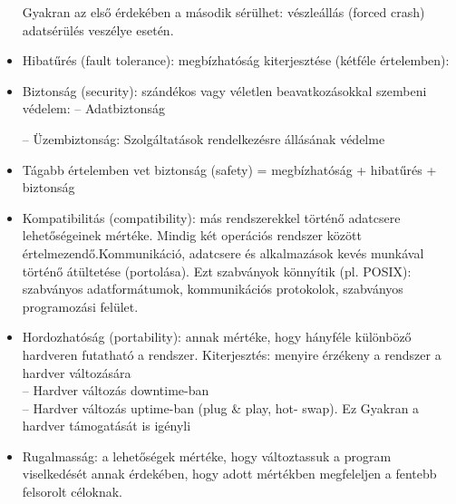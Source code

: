 \documentclass[fleqn,10pt,a4paper]{article}
\theoremstyle{magyar}
\begin{document}
\begin{itemize}
    Gyakran az első érdekében a második sérülhet: vészleállás (forced crash) adatsérülés veszélye esetén.
  \item Hibatűrés (fault tolerance): megbízhatóság kiterjesztése (kétféle értelemben):
  \item Biztonság (security): szándékos vagy véletlen beavatkozásokkal szembeni védelem: 
    -- Adatbiztonság
    --  Üzembiztonság: Szolgáltatások rendelkezésre állásának védelme 
  \item Tágabb értelemben vet biztonság (safety) = megbízhatóság + hibatűrés + biztonság
  \item Kompatibilitás (compatibility): más rendszerekkel történő adatcsere lehetőségeinek mértéke. Mindig két operációs
    rendszer között értelmezendő.Kommunikáció, adatcsere és alkalmazások kevés munkával történő átültetése (portolása).
    Ezt szabványok könnyítik (pl. POSIX):  szabványos adatformátumok, kommunikációs protokolok, szabványos programozási
    felület.
  \item  Hordozhatóság (portability): annak mértéke, hogy hányféle különböző hardveren futatható a
    rendszer. Kiterjesztés: menyire érzékeny a rendszer a hardver változására\\
    -- Hardver változás downtime-ban \\
    -- Hardver változás uptime-ban (plug \& play, hot- swap). Ez Gyakran a hardver támogatását is igényli
  \item  Rugalmasság: a lehetőségek mértéke, hogy változtassuk a program viselkedését annak érdekében, hogy adott
    mértékben megfeleljen a fentebb felsorolt céloknak.\\

\end{itemize}
\end{document}

